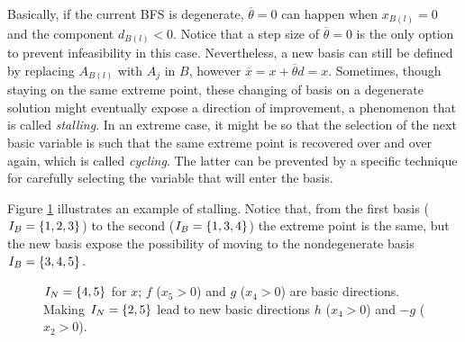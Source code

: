 Basically, if the current BFS is degenerate, $\overline{\theta} = 0$ can happen when $x_{B(l)} = 0$ and the component $d_{B(l)} < 0$. Notice that a step size of $\overline{\theta} = 0$ is the only option to prevent infeasibility in this case. Nevertheless, a new basis can still be defined by replacing $A_{B(l)}$ with $A_j$ in $B$, however $\overline{x} = x + \overline{\theta}d = x$. Sometimes, though staying on the same extreme point, these changing of basis on a degenerate solution might eventually expose a direction of improvement, a phenomenon that is called \emph{stalling}. In an extreme case, it might be so that the selection of the next basic variable is such that the same extreme point is recovered over and over again, which is called \emph{cycling}. The latter can be prevented by a specific technique for carefully selecting the variable that will enter the basis. 

Figure \ref{p1c4:fig:degenerate_basis} illustrates an example of stalling. Notice that, from the first basis ($I_B = \left\{ 1,2,3 \right \}$) to the second ($I_B = \left\{ 1,3,4 \right \}$) the extreme point is the same, but the new basis expose the possibility of moving to the nondegenerate basis $I_B=\left\{ 3,4,5 \right \}$.

\begin{figure}[h]
	\caption{ $I_N = \left\{ 4,5 \right \}$ for $x$; $f$ ($x_5 > 0$) and $g$ ($x_4 >0$) are basic directions. Making $I_N = \left\{ 2,5 \right \}$ lead to new basic directions $h$ ($x_4 > 0$) and $-g$ ($x_2 > 0$).} \label{p1c4:fig:degenerate_basis}
\end{figure}


